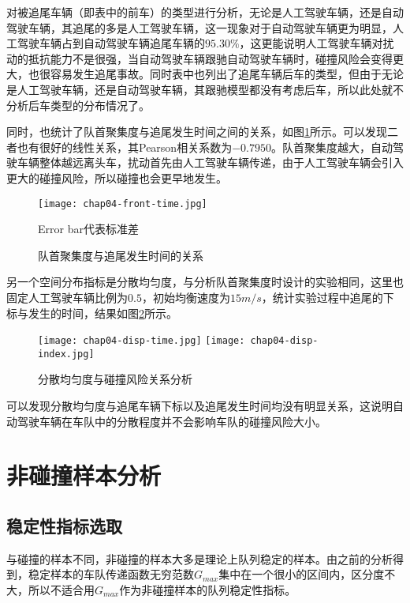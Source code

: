 对被追尾车辆（即表中的前车）的类型进行分析，无论是人工驾驶车辆，还是自动驾驶车辆，其追尾的多是人工驾驶车辆，这一现象对于自动驾驶车辆更为明显，人工驾驶车辆占到自动驾驶车辆追尾车辆的$95.30\%$，这更能说明人工驾驶车辆对扰动的抵抗能力不是很强，当自动驾驶车辆跟驰自动驾驶车辆时，碰撞风险会变得更大，也很容易发生追尾事故。同时表中也列出了追尾车辆后车的类型，但由于无论是人工驾驶车辆，还是自动驾驶车辆，其跟驰模型都没有考虑后车，所以此处就不分析后车类型的分布情况了。

同时，也统计了队首聚集度与追尾发生时间之间的关系，如图\ref{fig:chap04-6}所示。可以发现二者也有很好的线性关系，其Pearson相关系数为$-0.7950$。队首聚集度越大，自动驾驶车辆整体越远离头车，扰动首先由人工驾驶车辆传递，由于人工驾驶车辆会引入更大的碰撞风险，所以碰撞也会更早地发生。

\begin{figure}
    \centering
    \texttt{[image: chap04-front-time.jpg]}
    \caption*{Error bar代表标准差}
    \caption{队首聚集度与追尾发生时间的关系}
    \label{fig:chap04-6}
\end{figure} 

另一个空间分布指标是分散均匀度，与分析队首聚集度时设计的实验相同，这里也固定人工驾驶车辆比例为$0.5$，初始均衡速度为$15m/s$，统计实验过程中追尾的下标与发生的时间，结果如图\ref{fig:chap04-7}所示。

\begin{figure}
    \centering
      {\texttt{[image: chap04-disp-time.jpg]}}
      {\texttt{[image: chap04-disp-index.jpg]}}
      \caption{分散均匀度与碰撞风险关系分析}
    \label{fig:chap04-7}
  \end{figure}

可以发现分散均匀度与追尾车辆下标以及追尾发生时间均没有明显关系，这说明自动驾驶车辆在车队中的分散程度并不会影响车队的碰撞风险大小。

\section{非碰撞样本分析}

\subsection{稳定性指标选取}

 与碰撞的样本不同，非碰撞的样本大多是理论上队列稳定的样本。由之前的分析得到，稳定样本的车队传递函数无穷范数$G_{max}$集中在一个很小的区间内，区分度不大，所以不适合用$G_{max}$作为非碰撞样本的队列稳定性指标。

